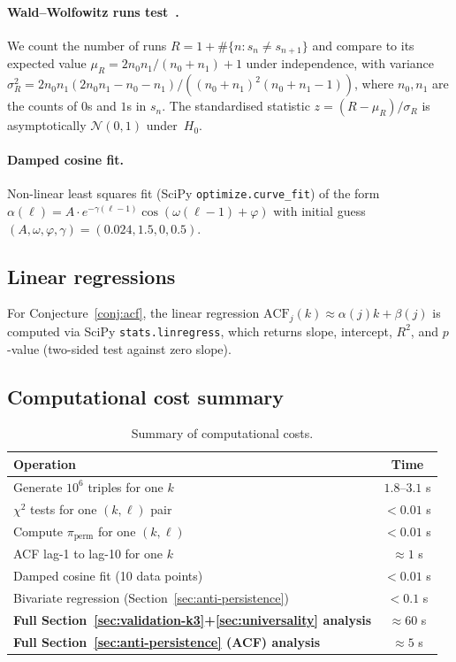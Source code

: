 \documentclass[11pt,a4paper]{article}
\theoremstyle{plain}
\theoremstyle{definition}
\newcommand{\PiP}{\pi_{\mathrm{perm}}}
\begin{document}
\paragraph{Wald--Wolfowitz runs test~\cite{wald}.}
We count the number of runs $R = 1 + \#\{n : s_n \neq s_{n+1}\}$ and compare
to its expected value $\mu_R = 2n_0 n_1/(n_0 + n_1) + 1$ under independence,
with variance $\sigma_R^2 = 2n_0 n_1 (2n_0 n_1 - n_0 - n_1) / ((n_0+n_1)^2
(n_0 + n_1 - 1))$, where $n_0, n_1$ are the counts of $0$s and $1$s in $s_n$.
The standardised statistic $z = (R - \mu_R)/\sigma_R$ is asymptotically
$\mathcal{N}(0, 1)$ under~$H_0$.

\paragraph{Damped cosine fit.}
Non-linear least squares fit (SciPy \texttt{optimize.curve\_fit}) of the form
$\alpha(\ell) = A \cdot e^{-\gamma(\ell-1)} \cos(\omega(\ell-1) + \varphi)$
with initial guess $(A, \omega, \varphi, \gamma) = (0.024, 1.5, 0, 0.5)$.

\subsection{Linear regressions}

For Conjecture~\ref{conj:acf}, the linear regression $\mathrm{ACF}_j(k) \approx
\alpha(j) k + \beta(j)$ is computed via SciPy \texttt{stats.linregress}, which
returns slope, intercept, $R^2$, and $p$-value (two-sided test against zero
slope).

\subsection{Computational cost summary}

\begin{table}[h!]
\centering
\caption{Summary of computational costs.}
\begin{tabular}{l c}
\toprule
Operation & Time \\
\midrule
Generate $10^6$ triples for one $k$ & $1.8$--$3.1$ s \\
$\chi^2$ tests for one $(k, \ell)$ pair & $< 0.01$ s \\
Compute $\PiP$ for one $(k, \ell)$ & $< 0.01$ s \\
ACF lag-1 to lag-10 for one $k$ & $\approx 1$ s \\
Damped cosine fit (10 data points) & $< 0.01$ s \\
Bivariate regression (Section~\ref{sec:anti-persistence}) & $< 0.1$ s \\
\midrule
\textbf{Full Section~\ref{sec:validation-k3}+\ref{sec:universality} analysis} & $\approx 60$ s \\
\textbf{Full Section~\ref{sec:anti-persistence} (ACF) analysis} & $\approx 5$ s \\
\bottomrule
\end{tabular}
\end{table}
\end{document}
